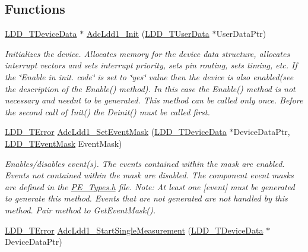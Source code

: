 \subsection*{Functions}
\begin{DoxyCompactItemize}
\item 
\hyperlink{group___p_e___types__module_gac5cf1362f1f0e3a2ce71b1bf2276d091}{L\+D\+D\+\_\+\+T\+Device\+Data} $\ast$ \hyperlink{group___adc_ldd1__module_gafdc37e93f468b5be237479085546273f}{Adc\+Ldd1\+\_\+\+Init} (\hyperlink{group___p_e___types__module_ga0b66a73f87238a782318aa0be7578e35}{L\+D\+D\+\_\+\+T\+User\+Data} $\ast$User\+Data\+Ptr)
\begin{DoxyCompactList}\small\item\em Initializes the device. Allocates memory for the device data structure, allocates interrupt vectors and sets interrupt priority, sets pin routing, sets timing, etc. If the \char`\"{}\+Enable in init. code\char`\"{} is set to \char`\"{}yes\char`\"{} value then the device is also enabled(see the description of the Enable() method). In this case the Enable() method is not necessary and needn\textquotesingle{}t to be generated. This method can be called only once. Before the second call of Init() the Deinit() must be called first. \end{DoxyCompactList}\item 
\hyperlink{group___p_e___types__module_ga24c2b045fd04e79e85f261ce4df35588}{L\+D\+D\+\_\+\+T\+Error} \hyperlink{group___adc_ldd1__module_ga12092218fe1fa9a31e8381eded85be0c}{Adc\+Ldd1\+\_\+\+Set\+Event\+Mask} (\hyperlink{group___p_e___types__module_gac5cf1362f1f0e3a2ce71b1bf2276d091}{L\+D\+D\+\_\+\+T\+Device\+Data} $\ast$Device\+Data\+Ptr, \hyperlink{group___p_e___types__module_gafbe7f4d4e51560399c3bdd0218584533}{L\+D\+D\+\_\+\+T\+Event\+Mask} Event\+Mask)
\begin{DoxyCompactList}\small\item\em Enables/disables event(s). The events contained within the mask are enabled. Events not contained within the mask are disabled. The component event masks are defined in the \hyperlink{_p_e___types_8h}{P\+E\+\_\+\+Types.\+h} file. Note\+: At least one \mbox{[}event\mbox{]} must be generated to generate this method. Events that are not generated are not handled by this method. Pair method to Get\+Event\+Mask(). \end{DoxyCompactList}\item 
\hyperlink{group___p_e___types__module_ga24c2b045fd04e79e85f261ce4df35588}{L\+D\+D\+\_\+\+T\+Error} \hyperlink{group___adc_ldd1__module_ga00728ff1e652d8d8d778917ca27e37a1}{Adc\+Ldd1\+\_\+\+Start\+Single\+Measurement} (\hyperlink{group___p_e___types__module_gac5cf1362f1f0e3a2ce71b1bf2276d091}{L\+D\+D\+\_\+\+T\+Device\+Data} $\ast$Device\+Data\+Ptr)

\end{DoxyCompactItemize}
